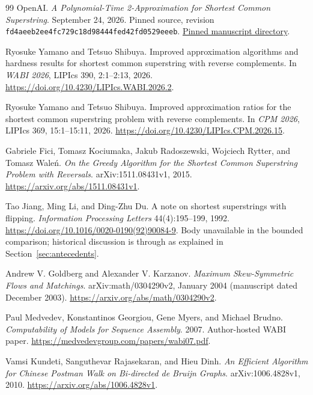 \begin{thebibliography}{99}
 OpenAI.
\emph{A Polynomial-Time 2-Approximation for Shortest Common Superstring}.
September 24, 2026. Pinned source, revision
\texttt{fd4aeeb2ee4fc729c18d98444fed42fd0529eeeb}.
\href{https://github.com/openai/math/tree/fd4aeeb2ee4fc729c18d98444fed42fd0529eeeb/preprints/A-Polynomial-Time-2-Approximation-for-Shortest-Common-Superstring-September-24-2026}{Pinned manuscript directory}.

 Ryosuke Yamano and Tetsuo Shibuya.
Improved approximation algorithms and hardness results for shortest
common superstring with reverse complements.
In \emph{WABI 2026}, LIPIcs 390, 2:1--2:13, 2026.
\url{https://doi.org/10.4230/LIPIcs.WABI.2026.2}.

 Ryosuke Yamano and Tetsuo Shibuya.
Improved approximation ratios for the shortest common superstring
problem with reverse complements.
In \emph{CPM 2026}, LIPIcs 369, 15:1--15:11, 2026.
\url{https://doi.org/10.4230/LIPIcs.CPM.2026.15}.

 Gabriele Fici, Tomasz Kociumaka, Jakub Radoszewski,
Wojciech Rytter, and Tomasz Wale\'n.
\emph{On the Greedy Algorithm for the Shortest Common Superstring
Problem with Reversals}. arXiv:1511.08431v1, 2015.
\url{https://arxiv.org/abs/1511.08431v1}.

 Tao Jiang, Ming Li, and Ding-Zhu Du.
A note on shortest superstrings with flipping.
\emph{Information Processing Letters} 44(4):195--199, 1992.
\url{https://doi.org/10.1016/0020-0190(92)90084-9}.
Body unavailable in the bounded comparison; historical discussion is
through \cite{fici,yscpm,yswabi} as explained in Section~\ref{sec:antecedents}.

 Andrew V. Goldberg and Alexander V. Karzanov.
\emph{Maximum Skew-Symmetric Flows and Matchings}.
arXiv:math/0304290v2, January 2004 (manuscript dated December 2003).
\url{https://arxiv.org/abs/math/0304290v2}.

 Paul Medvedev, Konstantinos Georgiou, Gene Myers,
and Michael Brudno. \emph{Computability of Models for Sequence Assembly}.
2007. Author-hosted WABI paper.
\url{https://medvedevgroup.com/papers/wabi07.pdf}.

 Vamsi Kundeti, Sanguthevar Rajasekaran, and Hieu Dinh.
\emph{An Efficient Algorithm for Chinese Postman Walk on Bi-directed
de Bruijn Graphs}. arXiv:1006.4828v1, 2010.
\url{https://arxiv.org/abs/1006.4828v1}.


\end{thebibliography}
